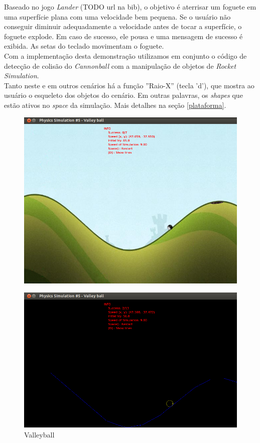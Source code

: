 Baseado no jogo \textit{Lander} (TODO url na bib), o objetivo é aterrisar um foguete em uma superfície plana com uma velocidade bem pequena. Se o usuário não conseguir diminuir adequadamente a velocidade antes de tocar a superfície, o foguete explode. Em caso de sucesso, ele pousa e uma mensagem de sucesso é exibida. As setas do teclado movimentam o foguete. \\

Com a implementação desta demonstração utilizamos em conjunto o código de detecção de colisão do \textit{Cannonball} com a manipulação de objetos de \textit{Rocket Simulation}. \\

Tanto neste e em outros cenários há a função ''Raio-X'' (tecla 'd'), que mostra ao usuário o esqueleto dos objetos do cenário. Em outras palavras, os \textit{shapes} que estão ativos no \textit{space} da simulação. Mais detalhes na seção \ref{plataforma}.

\begin{figure}[H]
\centering
  \includegraphics[scale=0.4]{images/valleyball.png}
\end{figure}
\begin{figure}[H]
\centering
  \includegraphics[scale=0.4]{images/valleyballE.png}
  \caption{Valleyball}
\end{figure}

